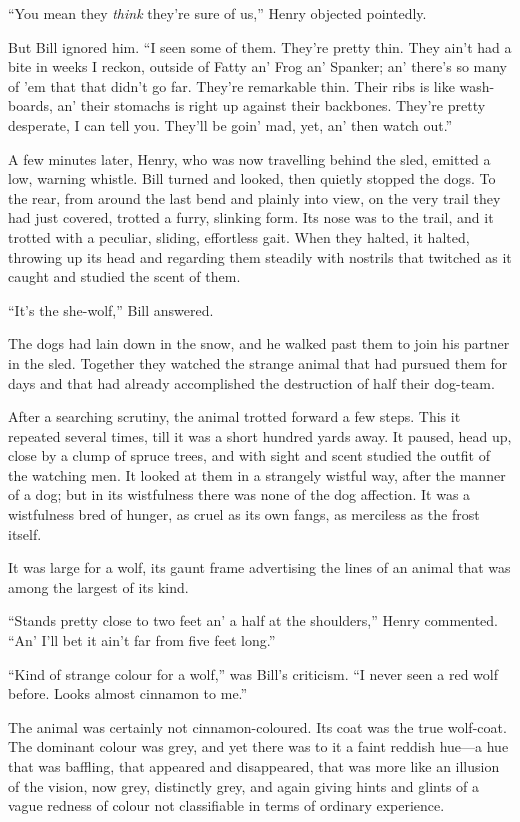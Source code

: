 “You mean they \textit{think} they’re sure of us,” Henry objected pointedly.

But Bill ignored him. “I seen some of them. They’re pretty thin. They
ain’t had a bite in weeks I reckon, outside of Fatty an’ Frog an’
Spanker; an’ there’s so many of ’em that that didn’t go far. They’re
remarkable thin. Their ribs is like wash-boards, an’ their stomachs is
right up against their backbones. They’re pretty desperate, I can tell
you. They’ll be goin’ mad, yet, an’ then watch out.”

A few minutes later, Henry, who was now travelling behind the sled,
emitted a low, warning whistle. Bill turned and looked, then quietly
stopped the dogs. To the rear, from around the last bend and plainly
into view, on the very trail they had just covered, trotted a furry,
slinking form. Its nose was to the trail, and it trotted with a
peculiar, sliding, effortless gait. When they halted, it halted,
throwing up its head and regarding them steadily with nostrils that
twitched as it caught and studied the scent of them.

“It’s the she-wolf,” Bill answered.

The dogs had lain down in the snow, and he walked past them to join his
partner in the sled. Together they watched the strange animal that had
pursued them for days and that had already accomplished the destruction
of half their dog-team.

After a searching scrutiny, the animal trotted forward a few steps.
This it repeated several times, till it was a short hundred yards away.
It paused, head up, close by a clump of spruce trees, and with sight
and scent studied the outfit of the watching men. It looked at them in
a strangely wistful way, after the manner of a dog; but in its
wistfulness there was none of the dog affection. It was a wistfulness
bred of hunger, as cruel as its own fangs, as merciless as the frost
itself.

It was large for a wolf, its gaunt frame advertising the lines of an
animal that was among the largest of its kind.

“Stands pretty close to two feet an’ a half at the shoulders,” Henry
commented. “An’ I’ll bet it ain’t far from five feet long.”

“Kind of strange colour for a wolf,” was Bill’s criticism. “I never
seen a red wolf before. Looks almost cinnamon to me.”

The animal was certainly not cinnamon-coloured. Its coat was the true
wolf-coat. The dominant colour was grey, and yet there was to it a
faint reddish hue—a hue that was baffling, that appeared and
disappeared, that was more like an illusion of the vision, now grey,
distinctly grey, and again giving hints and glints of a vague redness
of colour not classifiable in terms of ordinary experience.

